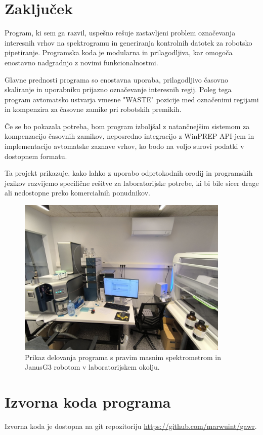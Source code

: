 \documentclass[a4paper,12pt]{article}
\begin{document}
\section{Zaključek}

Program, ki sem ga razvil, uspešno rešuje zastavljeni problem označevanja interesnih vrhov na spektrogramu in generiranja kontrolnih datotek za robotsko pipetiranje. Programska koda je modularna in prilagodljiva, kar omogoča enostavno nadgradnjo z novimi funkcionalnostmi.

Glavne prednosti programa so enostavna uporaba, prilagodljivo časovno skaliranje in uporabniku prijazno označevanje interesnih regij. Poleg tega program avtomatsko ustvarja vmesne "WASTE" pozicije med označenimi regijami in kompenzira za časovne zamike pri robotskih premikih.

Če se bo pokazala potreba, bom program izboljšal z natančnejšim sistemom za kompenzacijo časovnih zamikov, neposredno integracijo z WinPREP API-jem in implementacijo avtomatske zaznave vrhov, ko bodo na voljo surovi podatki v dostopnem formatu.

Ta projekt prikazuje, kako lahko z uporabo odprtokodnih orodij in programskih jezikov razvijemo specifične rešitve za laboratorijske potrebe, ki bi bile sicer drage ali nedostopne preko komercialnih ponudnikov.

\begin{figure}[H]
    \centering
    \includegraphics[width=0.9\textwidth]{assets/ermmm.jpg}
    \caption{Prikaz delovanja programa s pravim masnim spektrometrom in JanusG3 robotom v laboratorijskem okolju.}
    \label{fig:real_lab_application}
\end{figure}
\newpage
\appendix
\section{Izvorna koda programa}
Izvorna koda je dostopna na git repozitoriju \url{https://github.com/marwuint/gawr}. 
%
\end{document}
